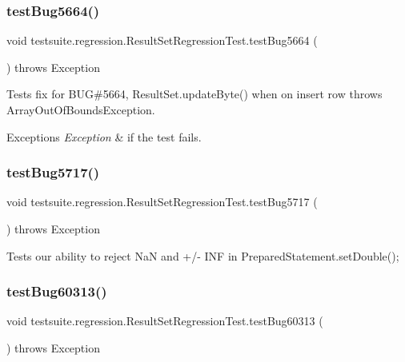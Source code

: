 \subsubsection{\texorpdfstring{test\+Bug5664()}{testBug5664()}}
{\footnotesize\ttfamily void testsuite.\+regression.\+Result\+Set\+Regression\+Test.\+test\+Bug5664 (\begin{DoxyParamCaption}{ }\end{DoxyParamCaption}) throws Exception}

Tests fix for B\+UG\#5664, Result\+Set.\+update\+Byte() when on insert row throws Array\+Out\+Of\+Bounds\+Exception.


\begin{DoxyExceptions}{Exceptions}
{\em Exception} & if the test fails. \\
\hline
\end{DoxyExceptions}
\mbox{\label{classtestsuite_1_1regression_1_1_result_set_regression_test_a08e8e83e8ac874e16cd5aa89e43f6862}} 
\subsubsection{\texorpdfstring{test\+Bug5717()}{testBug5717()}}
{\footnotesize\ttfamily void testsuite.\+regression.\+Result\+Set\+Regression\+Test.\+test\+Bug5717 (\begin{DoxyParamCaption}{ }\end{DoxyParamCaption}) throws Exception}

Tests our ability to reject NaN and +/-\/ I\+NF in Prepared\+Statement.\+set\+Double(); \mbox{\label{classtestsuite_1_1regression_1_1_result_set_regression_test_a0b66981060f0cf894fcac0ffacf7280d}} 
\subsubsection{\texorpdfstring{test\+Bug60313()}{testBug60313()}}
{\footnotesize\ttfamily void testsuite.\+regression.\+Result\+Set\+Regression\+Test.\+test\+Bug60313 (\begin{DoxyParamCaption}{ }\end{DoxyParamCaption}) throws Exception}

